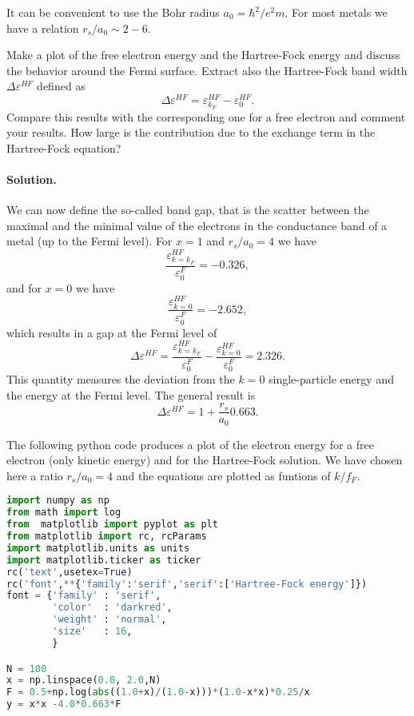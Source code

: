 \documentclass[graybox,sectrefs,envcountresetchap,open=right]{svmonodo}
\newenvironment{doconceexercise}{}{}
\begin{document}
\begin{doconceexercise}

It can be convenient to use the Bohr radius $a_0=\hbar^2/e^2m$.
For most metals we have a relation $r_s/a_0\sim 2-6$.

Make a plot of the free electron energy and the Hartree-Fock energy and discuss the behavior around the Fermi surface. Extract also   the Hartree-Fock band width $\Delta\varepsilon^{HF}$ defined as
\[ 
\Delta\varepsilon^{HF}=\varepsilon_{k_{F}}^{HF}-
\varepsilon_{0}^{HF}.
\]
Compare this results with the corresponding one for a free electron and comment your results. How large is the contribution due to the exchange term in the Hartree-Fock equation?


\paragraph{Solution.}
We can now define the so-called band gap, that is the scatter between the maximal and the minimal value of the electrons in the conductance band of a metal (up to the Fermi level). 
For $x=1$ and $r_s/a_0=4$ we have 
\[
\frac{\varepsilon_{k=k_F}^{HF} }{\varepsilon_{0}^{F}} = -0.326,
\]
and for $x=0$ we have
\[
\frac{\varepsilon_{k=0}^{HF} }{\varepsilon_{0}^{F}} = -2.652,
\]
which results in a gap at the Fermi level of 
\[
\Delta \varepsilon^{HF} = \frac{\varepsilon_{k=k_F}^{HF} }{\varepsilon_{0}^{F}}-\frac{\varepsilon_{k=0}^{HF} }{\varepsilon_{0}^{F}} = 2.326.
\]
This quantity measures the deviation from the $k=0$ single-particle energy and the energy at the Fermi level.
The general result is 
\[
\Delta \varepsilon^{HF} = 1+\frac{r_s}{a_0}0.663.
\]

The following python code produces a plot of the electron energy for a free electron (only kinetic energy) and 
for the Hartree-Fock solution. We have chosen here a ratio $r_s/a_0=4$ and the equations are plotted as funtions
of $k/f_F$. 
\begin{lstlisting}[language=Python,style=blue1]
import numpy as np
from math import log
from  matplotlib import pyplot as plt
from matplotlib import rc, rcParams
import matplotlib.units as units
import matplotlib.ticker as ticker
rc('text',usetex=True)
rc('font',**{'family':'serif','serif':['Hartree-Fock energy']})
font = {'family' : 'serif',
        'color'  : 'darkred',
        'weight' : 'normal',
        'size'   : 16,
        }

N = 100
x = np.linspace(0.0, 2.0,N)
F = 0.5+np.log(abs((1.0+x)/(1.0-x)))*(1.0-x*x)*0.25/x
y = x*x -4.0*0.663*F


\end{lstlisting}
\end{doconceexercise}
\end{document}
